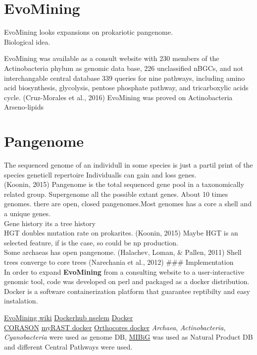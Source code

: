 \documentclass[12pt,twoside]{reedthesis}
\begin{document}
  \section{EvoMining}\label{evomining}
  
  EvoMining looks expansions on prokariotic pangenome.\\
  Biological idea.
  
  EvoMining was available as a consult website with 230 members of the
  Actinobacteria phylum as genomic data base, 226 unclassified nBGCs, and
  not interchangable central database 339 queries for nine pathways,
  including amino acid biosynthesis, glycolysis, pentose phosphate
  pathway, and tricarboxylic acids cycle. (Cruz-Morales et al., 2016)
  EvoMining was proved on Actinobacteria Arseno-lipids
  
  \section{Pangenome}\label{pangenome}
  
  The sequenced genome of an individull in some species is just a partil
  print of the species geneticll repertoire Individualls can gain and loss
  genes.\\
  (Koonin, 2015) Pangenome is the total sequenced gene pool in a
  taxonomically related group. Supergenome all the possible extant genes.
  About 10 times genomes. there are open, closed pangenomes.Most genomes
  has a core a shell and a unique genes.\\
  Gene history its a tree history\\
  HGT doubles mutation rate on prokarites. (Koonin, 2015) Maybe HGT is an
  selected feature, if is the case, so could be np production.\\
  Some archaeas has open pangenome. (Halachev, Loman, \& Pallen, 2011)
  Shell trees converge to core trees (Narechania et al., 2012) \#\#\#
  Implementation\\
  In order to expand \textbf{EvoMining} from a consulting website to a
  user-interactive genomic tool, code was developed on perl and packaged
  as a docker distribution. Docker is a software containerization platform
  that guarantee reptibilty and easy instalation.
  
  \href{https://github.com/nselem/EvoMining/wiki}{EvoMining wiki}
  \href{https://hub.docker.com/u/nselem/}{Dockerhub nselem}
  \href{https://www.docker.com/}{Docker}\\
  \href{https://github.com/nselem/EvoDivMet/wiki}{CORASON}
  \href{https://github.com/nselem/myrast}{myRAST docker}
  \href{https://github.com/nselem/orthocore}{Orthocores docker}
  \emph{Archaea}, \emph{Actinobacteria}, \emph{Cyanobacteria} were used as
  genome DB, \href{http://mibig.secondarymetabolites.org/}{MIBiG} was used
  as Natural Product DB and different Central Pathways were used.
  
\end{document}
